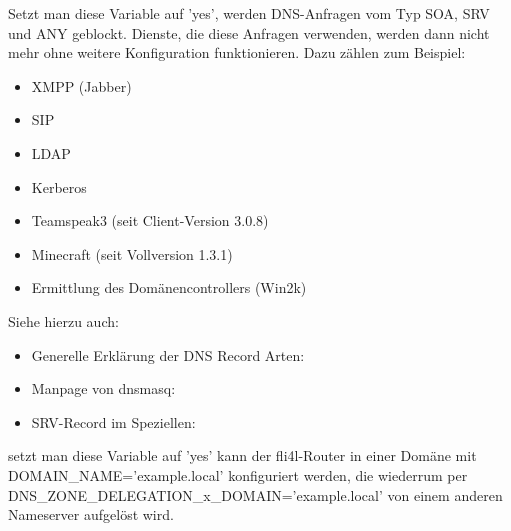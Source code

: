 \begin{description}
     {Setzt man diese Variable auf 'yes', werden DNS-Anfragen vom Typ SOA, SRV und ANY 
     geblockt. Dienste, die diese Anfragen verwenden, werden dann nicht mehr ohne weitere
     Konfiguration funktionieren.\hfil\break
     Dazu zählen zum Beispiel:
     \begin{itemize}
     \item XMPP (Jabber)
     \item SIP
     \item LDAP
     \item Kerberos
     \item Teamspeak3 (seit Client-Version 3.0.8)
     \item Minecraft (seit Vollversion 1.3.1)
     \item Ermittlung des Domänencontrollers (Win2k)
     \end{itemize}
     Siehe hierzu auch:}
     \begin{itemize}
     \item Generelle Erklärung der DNS Record Arten:\hfil\break
     \item Manpage von dnsmasq:\hfil\break
     \item SRV-Record im Speziellen:\hfil\break   
     \end{itemize}


     {setzt man diese Variable auf 'yes' kann der fli4l-Router in
     einer Domäne mit DOMAIN\_NAME='example.local' konfiguriert
     werden, die wiederrum per DNS\_ZONE\_DELEGATION\_x\_DOMAIN='example.local'
     von einem anderen Nameserver aufgelöst wird.}



\end{description}

